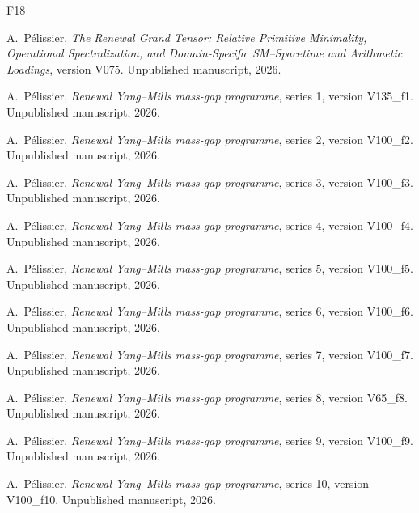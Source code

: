 \documentclass[11pt,oneside,openany]{book}
\theoremstyle{definition}
\theoremstyle{remark}
\begin{document}
\begin{thebibliography}{F18}


A.~P\'elissier, \emph{The Renewal Grand Tensor: Relative Primitive Minimality, Operational Spectralization, and Domain-Specific SM--Spacetime and Arithmetic Loadings}, version V075. Unpublished manuscript, 2026.


A.~P\'elissier, \emph{Renewal Yang--Mills mass-gap programme}, series 1, version V135\_f1. Unpublished manuscript, 2026.


A.~P\'elissier, \emph{Renewal Yang--Mills mass-gap programme}, series 2, version V100\_f2. Unpublished manuscript, 2026.


A.~P\'elissier, \emph{Renewal Yang--Mills mass-gap programme}, series 3, version V100\_f3. Unpublished manuscript, 2026.


A.~P\'elissier, \emph{Renewal Yang--Mills mass-gap programme}, series 4, version V100\_f4. Unpublished manuscript, 2026.


A.~P\'elissier, \emph{Renewal Yang--Mills mass-gap programme}, series 5, version V100\_f5. Unpublished manuscript, 2026.


A.~P\'elissier, \emph{Renewal Yang--Mills mass-gap programme}, series 6, version V100\_f6. Unpublished manuscript, 2026.


A.~P\'elissier, \emph{Renewal Yang--Mills mass-gap programme}, series 7, version V100\_f7. Unpublished manuscript, 2026.


A.~P\'elissier, \emph{Renewal Yang--Mills mass-gap programme}, series 8, version V65\_f8. Unpublished manuscript, 2026.


A.~P\'elissier, \emph{Renewal Yang--Mills mass-gap programme}, series 9, version V100\_f9. Unpublished manuscript, 2026.


A.~P\'elissier, \emph{Renewal Yang--Mills mass-gap programme}, series 10, version V100\_f10. Unpublished manuscript, 2026.


\end{thebibliography}
\end{document}

